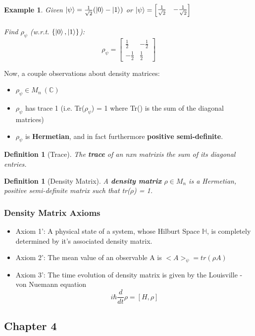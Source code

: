 \documentclass[12pt]{article}
\theoremstyle{plain}
\theoremstyle{nonumberplain}
\theoremstyle{plain}
\newtheorem{definition}[lemma]{Definition}
\newtheorem{example}[lemma]{Example}
\theoremstyle{nonumberplain}
\newcommand\1{{\bf 1}}
\newcommand{\bmat}[1]{\begin{bmatrix*} #1 \end{bmatrix*}} %
\newcommand{\C}{\mathbb{C}} %
\newcommand{\<}{\left\langle}
\renewcommand{\>}{\right\rangle}
\begin{document}
\begin{example} Given $\ket{\psi} = \frac{1}{\sqrt{2}}(\ket{0} - \ket{1})$ or $\ket{\psi} = \bmat{\frac{1}{\sqrt{2}} &-\frac{1}{\sqrt{2}}}$\\
\\
Find $\rho_\psi$ (w.r.t. $\{\ket{0}, \ket{1}\}$):
\begin{equation}
\rho_\psi = \bmat{\frac{1}{2} &-\frac{1}{2}\\ -\frac{1}{2} &\frac{1}{2}}
\end{equation}
\end{example}

Now, a couple observations about density matrices:
\begin{itemize}
\item $\rho_\psi \in M_n \ (\C)$
\item $\rho_\psi$ has trace 1 (i.e. Tr($\rho_\psi$) = 1 where Tr() is the sum of the diagonal matrices)
\item $\rho_\psi$ is \textbf{Hermetian}, and in fact furthermore \textbf{positive semi-definite}. 
\end{itemize}

\begin{definition} [Trace]
The \textbf{trace} of an nxn matrixis the sum of its diagonal entries.
\end{definition}


\begin{definition} [Density Matrix]
A \textbf{density matrix} $\rho \in M_n$ is a Hermetian, positive semi-definite matrix such that tr($\rho$) = 1.
\end{definition}

\subsubsection{Density Matrix Axioms}
\begin{itemize}
\item Axiom 1': A physical state of a system, whose Hilburt Space $\mathbb{H}$, is completely determined by it's associated density matrix. 
\item Axiom 2': The mean value of an observable A is $<A>_\psi = tr(\rho A)$
\item Axiom 3': The time evolution of density matrix is given by the Louisville - von Nuemann equation 
\begin{equation}
i\hbar \frac{d}{dt} \rho = [H,\rho]
\end{equation}
\end{itemize}
\pagebreak
\subsection{Chapter 4}
\end{document}
